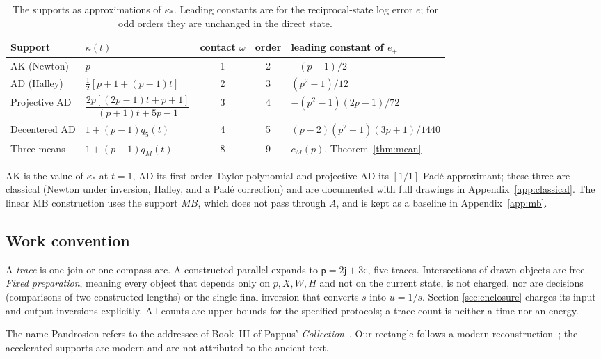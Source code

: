 \documentclass[10pt,a4paper]{article}
\theoremstyle{plain}
\theoremstyle{remark}
\numberwithin{equation}{section}
\newcommand{\jn}{\mathsf{j}}          %
\newcommand{\pl}{\mathsf{p}}          %
\newcommand{\ar}{\mathsf{c}}          %
\begin{document}
\begin{table}[htbp]
\centering\small
\caption{The supports as approximations of $\kappa_*$. Leading constants are for the reciprocal-state
log error $e$; for odd orders they are unchanged in the direct state.}\label{tab:supports}
\begin{tabular}{@{}llccl@{}}
\toprule
Support & $\kappa(t)$ & contact $\omega$ & order & leading constant of $e_+$\\
\midrule
AK (Newton) & $p$ & 1 & 2 & $-(p-1)/2$\\[2pt]
AD (Halley) & $\tfrac12[p+1+(p-1)t]$ & 2 & 3 & $(p^{2}-1)/12$\\[2pt]
Projective AD & $\dfrac{2p[(2p-1)t+p+1]}{(p+1)t+5p-1}$ & 3 & 4 & $-(p^{2}-1)(2p-1)/72$\\[6pt]
Decentered AD & $1+(p-1)q_5(t)$ & 4 & 5 & $(p-2)(p^{2}-1)(3p+1)/1440$\\[2pt]
Three means & $1+(p-1)q_M(t)$ & 8 & 9 & $c_M(p)$, Theorem~\ref{thm:mean}\\
\bottomrule
\end{tabular}
\end{table}

AK is the value of $\kappa_*$ at $t=1$, AD its first-order Taylor polynomial and projective AD its
$[1/1]$ Pad\'e approximant; these three are classical (Newton under inversion, Halley, and a Pad\'e
correction) and are documented with full drawings in Appendix~\ref{app:classical}. The linear MB
construction uses the support $MB$, which does not pass through $A$, and is kept as a baseline in
Appendix~\ref{app:mb}.

\subsection{Work convention}\label{sec:convention}

A \emph{trace} is one join or one compass arc. A constructed parallel expands to $\pl=2\jn+3\ar$, five
traces. Intersections of drawn objects are free. \emph{Fixed preparation}, meaning every object that
depends only on $p,X,W,H$ and not on the current state, is not charged, nor are decisions (comparisons
of two constructed lengths) or the single final inversion that converts $s$ into $u=1/s$. Section
\ref{sec:enclosure} charges its input and output inversions explicitly. All counts are upper bounds for
the specified protocols; a trace count is neither a time nor an energy.

The name Pandrosion refers to the addressee of Book~III of Pappus' \emph{Collection}~\cite{pappus}. Our
rectangle follows a modern reconstruction~\cite{launay}; the accelerated supports are modern and are not
attributed to the ancient text.
\end{document}
